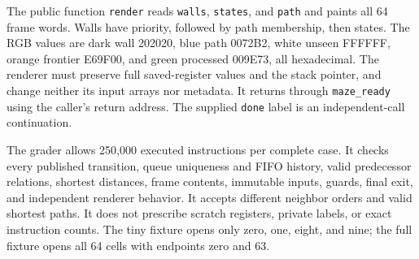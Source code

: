 The public function \texttt{render} reads \texttt{walls}, \texttt{states}, and \texttt{path} and paints all 64 frame words. Walls have priority, followed by path membership, then states. The RGB values are dark wall 202020, blue path 0072B2, white unseen FFFFFF, orange frontier E69F00, and green processed 009E73, all hexadecimal. The renderer must preserve full saved-register values and the stack pointer, and change neither its input arrays nor metadata. It returns through \texttt{maze\_ready} using the caller's return address. The supplied \texttt{done} label is an independent-call continuation.

The grader allows 250,000 executed instructions per complete case. It checks every published transition, queue uniqueness and FIFO history, valid predecessor relations, shortest distances, frame contents, immutable inputs, guards, final exit, and independent renderer behavior. It accepts different neighbor orders and valid shortest paths. It does not prescribe scratch registers, private labels, or exact instruction counts. The tiny fixture opens only zero, one, eight, and nine; the full fixture opens all 64 cells with endpoints zero and 63.

